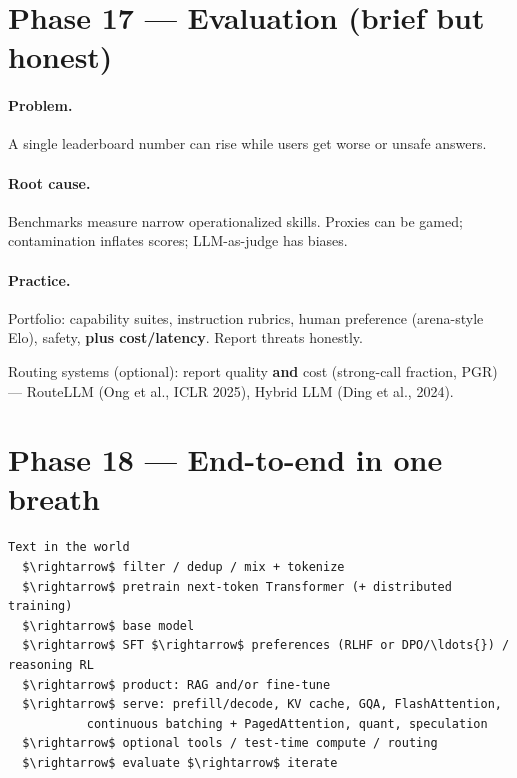 \documentclass[11pt,a4paper]{article}
\begin{document}
{{\bigskip


\clearpage
\section{Phase 17 --- Evaluation (brief but honest)}


\paragraph{Problem.}

A single leaderboard number can rise while users get worse or unsafe answers.


\paragraph{Root cause.}

Benchmarks measure narrow operationalized skills. Proxies can be gamed; contamination inflates scores; LLM-as-judge has biases.


\paragraph{Practice.}

Portfolio: capability suites, instruction rubrics, human preference (arena-style Elo), safety, \textbf{plus cost/latency}. Report threats honestly.


Routing systems (optional): report quality \textbf{and} cost (strong-call fraction, PGR) --- RouteLLM (Ong et al., ICLR 2025), Hybrid LLM (Ding et al., 2024).


\bigskip


\clearpage
\section{Phase 18 --- End-to-end in one breath}


\begin{lstlisting}
Text in the world
  $\rightarrow$ filter / dedup / mix + tokenize
  $\rightarrow$ pretrain next-token Transformer (+ distributed training)
  $\rightarrow$ base model
  $\rightarrow$ SFT $\rightarrow$ preferences (RLHF or DPO/\ldots{}) / reasoning RL
  $\rightarrow$ product: RAG and/or fine-tune
  $\rightarrow$ serve: prefill/decode, KV cache, GQA, FlashAttention,
           continuous batching + PagedAttention, quant, speculation
  $\rightarrow$ optional tools / test-time compute / routing
  $\rightarrow$ evaluate $\rightarrow$ iterate
\end{lstlisting}


}}
\end{document}
